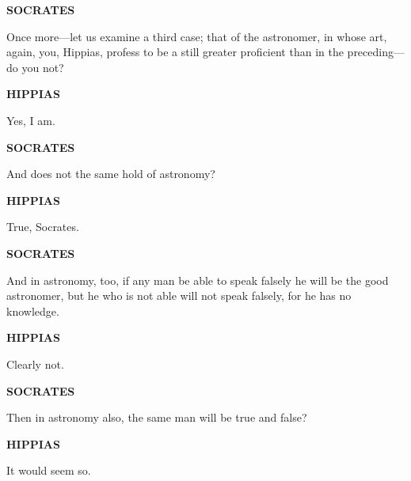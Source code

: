 \documentclass[11pt,letter]{article}
\begin{document}
\par \textbf{SOCRATES}
\par   Once more—let us examine a third case; that of the astronomer, in whose art, again, you, Hippias, profess to be a still greater proficient than in the preceding—do you not?

\par \textbf{HIPPIAS}
\par   Yes, I am.

\par \textbf{SOCRATES}
\par   And does not the same hold of astronomy?

\par \textbf{HIPPIAS}
\par   True, Socrates.

\par \textbf{SOCRATES}
\par   And in astronomy, too, if any man be able to speak falsely he will be the good astronomer, but he who is not able will not speak falsely, for he has no knowledge.

\par \textbf{HIPPIAS}
\par   Clearly not.

\par \textbf{SOCRATES}
\par   Then in astronomy also, the same man will be true and false?

\par \textbf{HIPPIAS}
\par   It would seem so.
\end{document}
